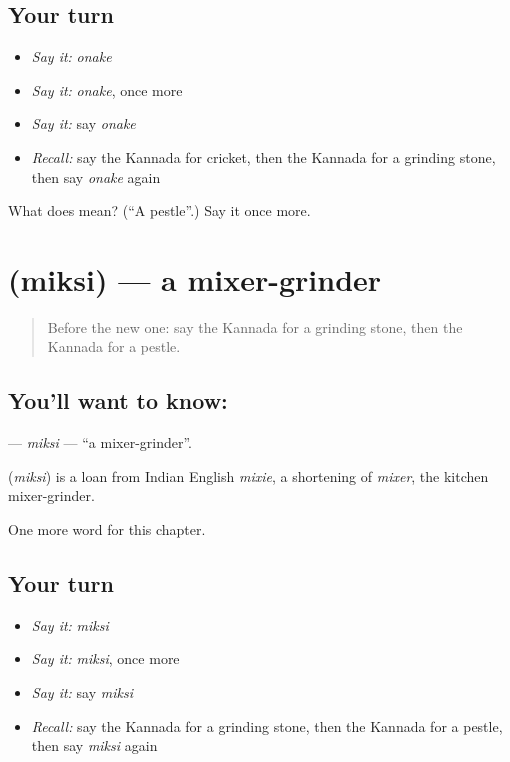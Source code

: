 \subsection*{Your turn}
\begin{itemize}
\raggedright
  \item \emph{Say it:} \emph{onake}
  \item \emph{Say it:} \emph{onake}, once more
  \item \emph{Say it:} say \emph{onake}
  \item \emph{Recall:} say the Kannada for cricket, then the Kannada for a grinding stone, then say \emph{onake} again
\end{itemize}

\begin{tcolorbox}[breakable,colback=teal!4,colframe=teal!35!black,title={Before you move on}]
What does  mean? (\textquotedblleft{}A pestle\textquotedblright{}.) Say it once more.
\end{tcolorbox}
\section[\texorpdfstring{\kn{ಮಿಕ್ಸಿ} (miksi)}{ಮಿಕ್ಸಿ (miksi)}]{ (miksi) — a mixer-grinder}

\label{lesson:KA-C192-miksi}



\begin{quote}
Before the new one: say the Kannada for a grinding stone, then the Kannada for a pestle.
\end{quote}

\subsection*{You'll want to know: }
\textbf{} — \emph{miksi} — \textquotedblleft{}a mixer-grinder\textquotedblright{}.

\begin{cousinweb}
\textbf{} (\emph{miksi}) is a loan from Indian English \emph{mixie}, a shortening of \emph{mixer}, the kitchen mixer-grinder.
\end{cousinweb}

\begin{grammarlens}[title={What you've built}]
One more word for this chapter.
\end{grammarlens}

\subsection*{Your turn}
\begin{itemize}
\raggedright
  \item \emph{Say it:} \emph{miksi}
  \item \emph{Say it:} \emph{miksi}, once more
  \item \emph{Say it:} say \emph{miksi}
  \item \emph{Recall:} say the Kannada for a grinding stone, then the Kannada for a pestle, then say \emph{miksi} again
\end{itemize}

